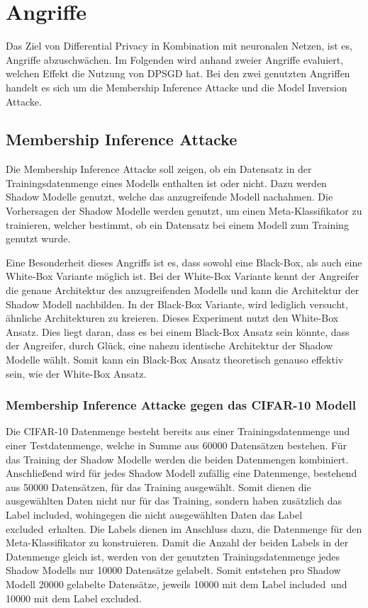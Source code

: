 \section{Angriffe}\label{sec:exp_angriffe}

Das Ziel von Differential Privacy in Kombination mit neuronalen Netzen, ist es, Angriffe abzuschwächen. 
Im Folgenden wird anhand zweier Angriffe evaluiert, welchen Effekt die Nutzung von DPSGD hat.
Bei den zwei genutzten Angriffen handelt es sich um die Membership Inference Attacke und die Model Inversion Attacke.

\subsection{Membership Inference Attacke}

Die Membership Inference Attacke soll zeigen, ob ein Datensatz in der Trainingsdatenmenge eines Modells enthalten ist oder nicht.
Dazu werden Shadow Modelle genutzt, welche das anzugreifende Modell nachahmen. 
Die Vorhersagen der Shadow Modelle werden genutzt, um einen Meta-Klassifikator zu trainieren, welcher bestimmt, ob ein Datensatz bei einem Modell zum Training genutzt wurde.

Eine Besonderheit dieses Angriffs ist es, dass sowohl eine Black-Box, als auch eine White-Box Variante möglich ist.
Bei der White-Box Variante kennt der Angreifer die genaue Architektur des anzugreifenden Modells und kann die Architektur der Shadow Modell nachbilden.
In der Black-Box Variante, wird lediglich versucht, ähnliche Architekturen zu kreieren.
Dieses Experiment nutzt den White-Box Ansatz.
Dies liegt daran, dass es bei einem Black-Box Ansatz sein könnte, dass der Angreifer, durch Glück, eine nahezu identische Architektur der Shadow Modelle wählt. 
Somit kann ein Black-Box Ansatz theoretisch genauso effektiv sein, wie der White-Box Ansatz.

\subsubsection*{Membership Inference Attacke gegen das CIFAR-10 Modell}

Die CIFAR-10 Datenmenge besteht bereits aus einer Trainingsdatenmenge und einer Testdatenmenge, welche in Summe aus 60000 Datensätzen bestehen.
Für das Training der Shadow Modelle werden die beiden Datenmengen kombiniert.
Anschließend wird für jedes Shadow Modell zufällig eine Datenmenge, bestehend aus 50000 Datensätzen, für das Training ausgewählt.
Somit dienen die ausgewählten Daten nicht nur für das Training, sondern haben zusätzlich das Label \dq included\dq, wohingegen die nicht ausgewählten Daten das Label \dq excluded\dq\ erhalten.
Die Labels dienen im Anschluss dazu, die Datenmenge für den Meta-Klassifikator zu konstruieren.
Damit die Anzahl der beiden Labels in der Datenmenge gleich ist, werden von der genutzten Trainingsdatenmenge jedes Shadow Modells nur 10000 Datensätze gelabelt.
Somit entstehen pro Shadow Modell 20000 gelabelte Datensätze, jeweils 10000 mit dem Label \dq included\dq\ und 10000 mit dem Label \dq excluded\dq.

